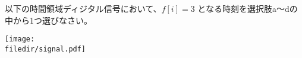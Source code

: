 以下の時間領域ディジタル信号において、$f[i]=3$ となる時刻を選択肢a〜dの中から1つ選びなさい。

\centering\texttt{[image: \\filedir/signal.pdf]}
